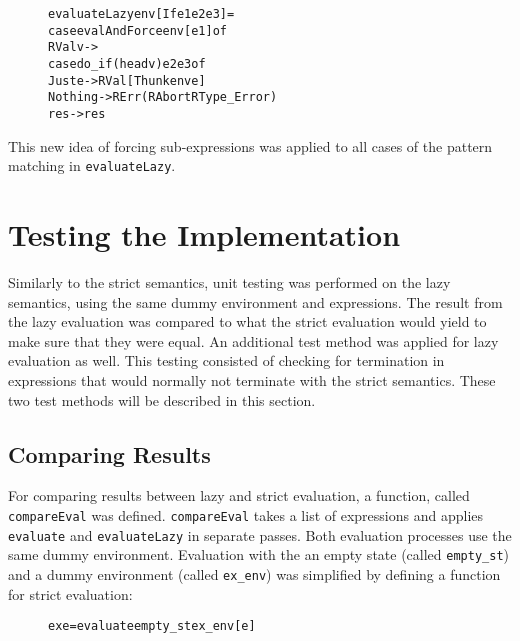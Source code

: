 \begin{figure}[H]
\begin{alltt}
  evaluateLazy env [If e1 e2 e3]   =
    case evalAndForce env [e1] of
      RVal v ->
        case do_if (head v) e2 e3 of
          Just e  -> RVal [Thunk env e]
          Nothing -> RErr (RAbort RType_Error)
      res -> res
\end{alltt}
\end{figure}

This new idea of forcing sub-expressions was applied to all cases of the
pattern matching in \texttt{evaluateLazy}.

\section{Testing the Implementation}

Similarly to the strict semantics, unit testing was performed on the lazy
semantics, using the same dummy environment and expressions. 
The result from the lazy evaluation was compared to what the strict evaluation
would yield to make sure that they were equal. An additional test method was
applied for lazy evaluation as well. This testing consisted of checking for
termination in expressions that would normally not terminate with the strict
semantics. These two test methods will be described in this section.

\subsection{Comparing Results}
For comparing results between lazy and strict evaluation, a function, called
\texttt{compareEval} was defined. \texttt{compareEval} takes a list of
expressions and applies \texttt{evaluate} and \texttt{evaluateLazy}
in separate passes. Both evaluation processes use the same dummy environment.
Evaluation with the an empty state (called \texttt{empty\_st}) and
a dummy environment (called \texttt{ex\_env}) was simplified by defining a
function for strict evaluation:

\begin{figure}[H]
\begin{alltt}
  ex e = evaluate empty_st ex_env [e]
\end{alltt}
\end{figure}

